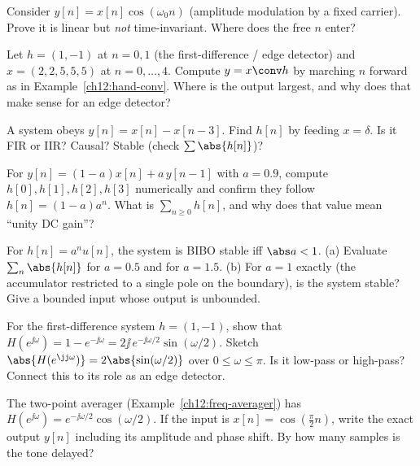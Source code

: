 \begin{exercise}
Consider $y[n]=x[n]\cos(\omega_0 n)$ (amplitude modulation by a fixed carrier).
Prove it is linear but \emph{not} time-invariant. Where does the free $n$ enter?
\end{exercise}

\begin{exercise}
Let $h=(1,-1)$ at $n=0,1$ (the first-difference / edge detector) and
$x=(2,2,5,5,5)$ at $n=0,\dots,4$. Compute $y=x\conv h$ by marching $n$ forward
as in Example~\ref{ch12:hand-conv}. Where is the output largest, and why does
that make sense for an edge detector?
\end{exercise}

\begin{exercise}
A system obeys $y[n]=x[n]-x[n-3]$. Find $h[n]$ by feeding $x=\delta$. Is it FIR
or IIR? Causal? Stable (check $\sum\abs{h[n]}$)?
\end{exercise}

\begin{exercise}
For $y[n]=(1-a)x[n]+a\,y[n-1]$ with $a=0.9$, compute $h[0],h[1],h[2],h[3]$
numerically and confirm they follow $h[n]=(1-a)a^n$. What is $\sum_{n\ge0}h[n]$,
and why does that value mean ``unity DC gain''?
\end{exercise}

\begin{exercise}
For $h[n]=a^n u[n]$, the system is BIBO stable iff $\abs a<1$. (a) Evaluate
$\sum_n\abs{h[n]}$ for $a=0.5$ and for $a=1.5$. (b) For $a=1$ exactly (the
accumulator restricted to a single pole on the boundary), is the system stable?
Give a bounded input whose output is unbounded.
\end{exercise}

\begin{exercise}
For the first-difference system $h=(1,-1)$, show that
$H(e^{\jj\omega})=1-e^{-\jj\omega}=2\jj\,e^{-\jj\omega/2}\sin(\omega/2)$. Sketch
$\abs{H(e^{\jj\omega})}=2\abs{\sin(\omega/2)}$ over $0\le\omega\le\pi$. Is it
low-pass or high-pass? Connect this to its role as an edge detector.
\end{exercise}

\begin{exercise}
The two-point averager (Example~\ref{ch12:freq-averager}) has
$H(e^{\jj\omega})=e^{-\jj\omega/2}\cos(\omega/2)$. If the input is
$x[n]=\cos(\tfrac{\pi}{2}n)$, write the exact output $y[n]$ including its
amplitude and phase shift. By how many samples is the tone delayed?
\end{exercise}

